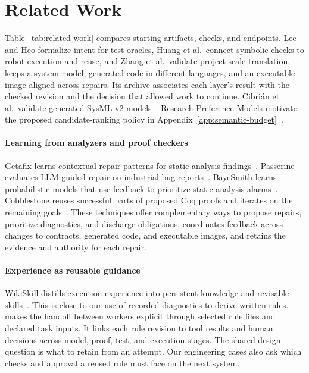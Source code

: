 \section{Related Work}
\label{sec:related}

Table~\ref{tab:related-work} compares starting artifacts, checks, and endpoints. Lee and Heo formalize intent for test oracles, Huang et al.\ connect symbolic checks to robot execution and reuse, and Zhang et al.\ validate project-scale translation. \workbench{} keeps a system model, generated code in different languages, and an executable image aligned across repairs. Its archive associates each layer's result with the checked revision and the decision that allowed work to continue. Cibri\'an et al.\ validate generated SysML v2 models~\cite{cibrian2025sysml}. Research Preference Models motivate the proposed candidate-ranking policy in Appendix~\ref{app:semantic-budget}~\cite{foster2026rpm}.

\paragraph{Learning from analyzers and proof checkers}
Getafix learns contextual repair patterns for static-analysis findings~\cite{bader2019getafix}. Passerine evaluates LLM-guided repair on industrial bug reports~\cite{rondon2025passerine}. BayeSmith learns probabilistic models that use feedback to prioritize static-analysis alarms~\cite{kim2022bayesmith}. Cobblestone reuses successful parts of proposed Coq proofs and iterates on the remaining goals~\cite{kasibatla2026cobblestone}. These techniques offer complementary ways to propose repairs, prioritize diagnostics, and discharge obligations. \workbench{} coordinates feedback across changes to contracts, generated code, and executable images, and retains the evidence and authority for each repair.

\paragraph{Experience as reusable guidance}
WikiSkill distills execution experience into persistent knowledge and revisable skills~\cite{tang2026wikiskill}. This is close to our use of recorded diagnostics to derive written rules. \workbench{} makes the handoff between workers explicit through selected rule files and declared task inputs. It links each rule revision to tool results and human decisions across model, proof, test, and execution stages. The shared design question is what to retain from an attempt. Our engineering cases also ask which checks and approval a reused rule must face on the next system.

